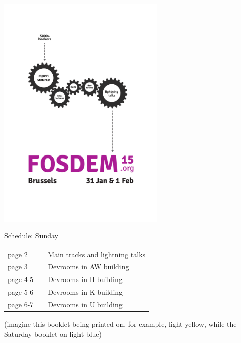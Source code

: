 \documentclass[a4paper,10pt]{article}
\begin{document}
\pagestyle{empty}
\label{cover}
\begin{center}
\includegraphics[width=0.6\textwidth]{artwork/flyer_nobg}


{\fontsize{40}{50}\selectfont
\bf

Schedule: Sunday
}

\vfill

{\huge
\begin{tabular}{lll}
page 2   & &  Main tracks and lightning talks \\
page 3   & &  Devrooms in AW building \\
page 4-5 & &  Devrooms in H building \\
page 5-6 & &  Devrooms in K building \\
page 6-7 & &  Devrooms in U building \\
\end{tabular}
}

\vfill
(imagine this booklet being printed on, for example, light yellow, while the Saturday booklet on light blue)

\end{center}



{%
\fontsize{10}{8.6}\selectfont%
\renewcommand{\arraystretch}{0.9}%
%
%
}


\end{document}
